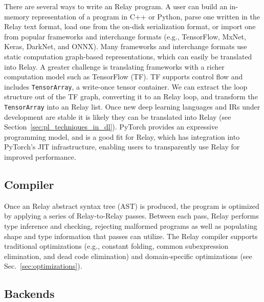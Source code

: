 There are several ways to write an Relay program.
A user can build an in-memory representation of
  a program in C++ or Python,
  parse one written in the Relay text format,
  load one from the on-disk serialization format,
  or import one from popular frameworks and interchange formats
    (e.g., TensorFlow, MxNet, Keras, DarkNet, and ONNX).
Many frameworks and interchange formats use static computation graph-based representations,
  which can easily be translated into Relay.
A greater challenge is translating frameworks
  with a richer computation model such as TensorFlow (TF).
TF supports control flow and includes \verb|TensorArray|, a write-once
  tensor container.
We can extract the loop structure out of the TF graph, converting
  it to an Relay loop, and transform the \verb|TensorArray| into an Relay list.
Once new deep learning languages and IRs under development
  are stable it is likely they can be translated into Relay (see
  Section~\ref{sec:pl_techniques_in_dl}).
PyTorch provides an expressive programming model, and is a good fit
  for Relay, which has integration into PyTorch's JIT infrastructure,
  enabling users to transparently use Relay for improved performance.

\subsection*{Compiler}
Once an Relay abstract syntax tree (AST) is produced,
  the program is optimized by applying a series of Relay-to-Relay
  passes.
Between each pass, Relay performs type inference and checking,
  rejecting malformed programs as well as populating shape and type
  information that passes can utilize.
The Relay compiler supports traditional optimizations
  (e.g., constant folding, common subexpression elimination, and dead code elimination)
  and domain-specific optimizations
  (see Sec.~\ref{sec:optimizations}).

\subsection*{Backends}

